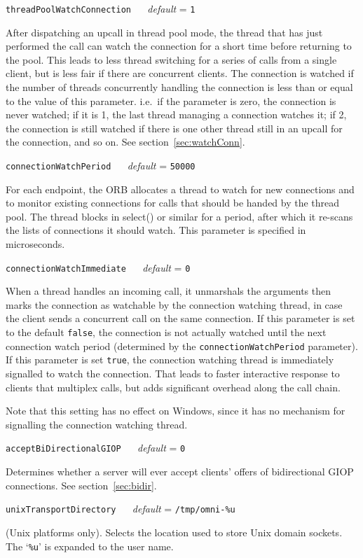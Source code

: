 \documentclass[11pt,oneside,a4paper]{book}
\makeatletter
\newcommand{\code}[1]{\texttt{#1}}
\newcommand{\confopt}[2]
  {\vspace{\baselineskip}\par\noindent\code{#1} ~~ \textit{default} =
   \code{#2}}
\renewcommand{\confopt}[2]
  {\vspace{\baselineskip}\par\noindent\code{#1} ~~ \textit{default} =
   \code{#2}\\[-1ex]\@afterheading}
\makeatother
\begin{document}
\confopt{threadPoolWatchConnection}{1}

After dispatching an upcall in thread pool mode, the thread that has
just performed the call can watch the connection for a short time
before returning to the pool. This leads to less thread switching for
a series of calls from a single client, but is less fair if there are
concurrent clients. The connection is watched if the number of threads
concurrently handling the connection is less than or equal to the
value of this parameter. i.e.\ if the parameter is zero, the
connection is never watched; if it is 1, the last thread managing a
connection watches it; if 2, the connection is still watched if there
is one other thread still in an upcall for the connection, and so
on. See section~\ref{sec:watchConn}.


\confopt{connectionWatchPeriod}{50000}

For each endpoint, the ORB allocates a thread to watch for new
connections and to monitor existing connections for calls that should
be handed by the thread pool. The thread blocks in select() or similar
for a period, after which it re-scans the lists of connections it
should watch. This parameter is specified in microseconds.


\confopt{connectionWatchImmediate}{0}

When a thread handles an incoming call, it unmarshals the arguments
then marks the connection as watchable by the connection watching
thread, in case the client sends a concurrent call on the same
connection. If this parameter is set to the default \code{false}, the
connection is not actually watched until the next connection watch
period (determined by the \code{connectionWatchPeriod} parameter).  If
this parameter is set \code{true}, the connection watching thread is
immediately signalled to watch the connection. That leads to faster
interactive response to clients that multiplex calls, but adds
significant overhead along the call chain.

Note that this setting has no effect on Windows, since it has no
mechanism for signalling the connection watching thread.


\confopt{acceptBiDirectionalGIOP}{0}

Determines whether a server will ever accept clients' offers of
bidirectional GIOP connections. See section~\ref{sec:bidir}.


\confopt{unixTransportDirectory}{/tmp/omni-\%u}

(Unix platforms only). Selects the location used to store Unix domain
sockets. The `\code{\%u}' is expanded to the user name.
\end{document}
